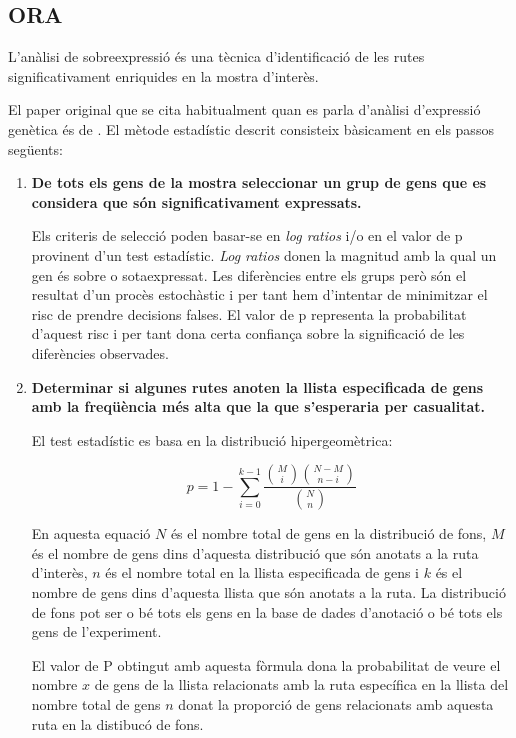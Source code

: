 \documentclass[]{article}
\begin{document}
\subsection{ORA}

L'anàlisi de sobreexpressió és una tècnica d'identificació de les rutes significativament enriquides en la mostra d'interès. 

El paper original que se cita habitualment quan es parla d'anàlisi d'expressió genètica és de \cite{boyle2004go}. El mètode estadístic descrit consisteix bàsicament en els passos següents:

\begin{enumerate}
\item \textbf{De tots els gens de la mostra seleccionar un grup de gens que es considera que són significativament expressats.}

Els criteris de selecció poden basar-se en \textit{log ratios} i/o en el valor de p provinent d'un test estadístic. \textit{Log ratios} donen la magnitud amb la qual un gen és sobre o sotaexpressat. Les diferències entre els grups però són el resultat d'un procès estochàstic i per tant hem d'intentar de minimitzar el risc de prendre decisions falses. El valor de p representa la probabilitat d'aquest risc i per tant dona certa confiança sobre la significació de les diferències observades.

\item \textbf{Determinar si algunes rutes anoten la llista especificada de gens amb la freqüència més alta que la que s’esperaria per casualitat.} 

El test estadístic es basa en la distribució hipergeomètrica: 

$$p = 1 - \displaystyle\sum_{i = 0}^{k-1}\frac{{M \choose i}{{N-M} \choose {n-i}}} {{N \choose n}}$$

En aquesta equació $N$ és el nombre total de gens en la distribució de fons, $M$ és el nombre de gens dins d'aquesta distribució que són anotats a la ruta d'interès, $n$ és el nombre total en la llista especificada de gens i $k$ és el nombre de gens dins d'aquesta llista que són anotats a la ruta. La distribució de fons pot ser o bé tots els gens en la base de dades d'anotació o bé tots els gens de l'experiment.

El valor de P obtingut amb aquesta fòrmula dona la probabilitat de veure el nombre $x$ de gens de la llista relacionats amb la ruta específica en la llista del nombre total de gens $n$ donat la proporció de gens relacionats amb aquesta ruta en la distibucó de fons.
\end{enumerate}
\end{document}
